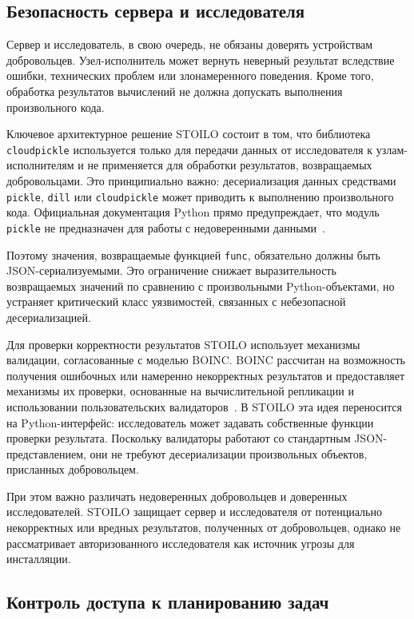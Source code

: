\documentclass[a4paper,12pt]{extarticle}
\begin{document}
\subsection{Безопасность сервера и исследователя}

Сервер и исследователь, в свою очередь, не обязаны доверять устройствам добровольцев.
Узел-исполнитель может вернуть неверный результат вследствие ошибки, технических проблем или злонамеренного поведения.
Кроме того, обработка результатов вычислений не должна допускать выполнения произвольного кода.

Ключевое архитектурное решение STOILO состоит в том, что библиотека \texttt{cloudpickle} используется только для передачи данных от исследователя к узлам-исполнителям и не применяется для обработки результатов, возвращаемых добровольцами.
Это принципиально важно: десериализация данных средствами \texttt{pickle}, \texttt{dill} или \texttt{cloudpickle} может приводить к выполнению произвольного кода.
Официальная документация Python прямо предупреждает, что модуль \texttt{pickle} не предназначен для работы с недоверенными данными~\cite{python_pickle_security}.

Поэтому значения, возвращаемые функцией \texttt{func}, обязательно должны быть JSON-сериализуемыми.
Это ограничение снижает выразительность возвращаемых значений по сравнению с произвольными Python-объектами, но устраняет критический класс уязвимостей, связанных с небезопасной десериализацией.

Для проверки корректности результатов STOILO использует механизмы валидации, согласованные с моделью BOINC.
BOINC рассчитан на возможность получения ошибочных или намеренно некорректных результатов и предоставляет механизмы их проверки, основанные на вычислительной репликации и использовании пользовательских валидаторов~\cite{boinc_security}.
В STOILO эта идея переносится на Python-интерфейс: исследователь может задавать собственные функции проверки результата.
Поскольку валидаторы работают со стандартным JSON-представлением, они не требуют десериализации произвольных объектов, присланных добровольцем.

При этом важно различать недоверенных добровольцев и доверенных исследователей.
STOILO защищает сервер и исследователя от потенциально некорректных или вредных результатов, полученных от добровольцев, однако не рассматривает авторизованного исследователя как источник угрозы для инсталляции.

\subsection{Контроль доступа к планированию задач}
\end{document}
